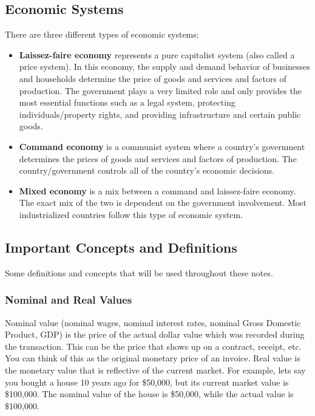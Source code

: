 \documentclass[a4paper, 12pt] {article}
\begin{document}
\subsection{Economic Systems}
There are three different types of economic systems:
\begin{itemize}
    \item \textbf{Laissez-faire economy}
        represents a pure capitalist system (also called a price system). In this
        economy, the supply and demand behavior of businesses and households 
        determine the price of goods and services and factors of production. The
        government plays a very limited role and only provides the most essential
        functions such as a legal system, protecting individuals/property rights,
        and providing infrastructure and certain public goods.

    \item \textbf{Command economy}
        is a communist system where a country's government determines the prices
        of goods and services and factors of production. The country/government
        controls all of the country's economic decisions.

    \item \textbf{Mixed economy}
        is a mix between a command and laissez-faire economy. The exact mix of
        the two is dependent on the government involvement. Most industrialized
        countries follow this type of economic system.

\end{itemize}

\subsection{Important Concepts and Definitions}
Some definitions and concepts that will be used throughout these notes.

\subsubsection{Nominal and Real Values}
Nominal value (nominal wages, nominal interest rates, nominal Gross Domestic
Product, GDP) is the price of the actual dollar value which was recorded during
the transaction. This can be the price that shows up on a contract, receipt, etc.
You can think of this as the original monetary price of an invoice. Real value
is the monetary value that is reflective of the current market. For example,
lets say you bought a house 10 years ago for \$50,000, but its current market
value is \$100,000. The nominal value of the house is \$50,000, while the actual
value is \$100,000.
\end{document}
